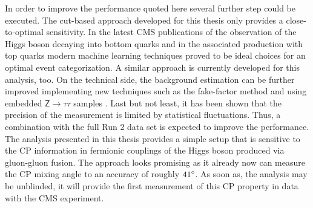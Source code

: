 In order to improve the performance quoted here several further step could be executed. 
The cut-based approach developed for this thesis only provides a close-to-optimal sensitivity. In the latest 
CMS publications of the observation of the Higgs boson decaying into bottom quarks \cite{hbb} and in the associated production with top quarks \cite{Sirunyan:2312113} modern machine learning techniques proved to 
be ideal choices for an optimal event categorization. A similar approach is currently developed for this analysis, too.
On the technical side, the background estimation can be further improved implementing new techniques such as the fake-factor method and using embedded $\mathsf{Z\rightarrow \tau\tau}$ samples \cite{Bechtel:48943}.
Last but not least, it has been shown that the precision of the measurement is limited by statistical fluctuations. Thus, a combination with the full Run 2 data set
is expected to improve the performance.
The analysis presented in this thesis provides a simple setup that is sensitive to the CP information in fermionic couplings of the Higgs boson produced via gluon-gluon fusion.
The approach looks promising as it already now can measure the CP mixing angle to an accuracy of roughly $\text{41}^{\circ}$.
As soon as, the analysis may be unblinded, it will provide the first measurement of this CP property in data with the CMS experiment.
